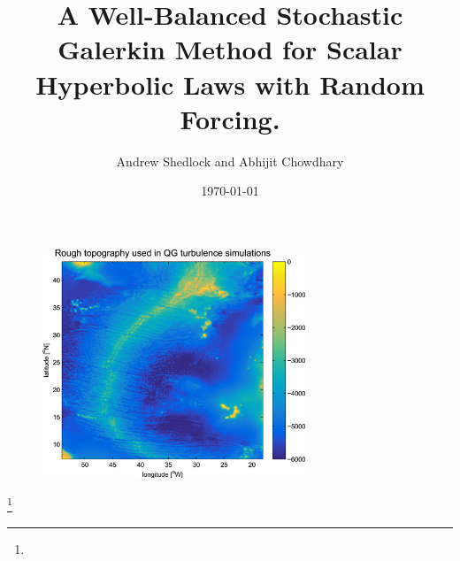 \documentclass[
    pdf,
    11pt,
    xcolor={svgnames},
  ]{beamer}
\title[WBSG for Random Scalar Hyperbolic Laws]{%
  A Well-Balanced Stochastic Galerkin Method for Scalar Hyperbolic Laws with Random Forcing.
}
\author[Chowdhary, Shedlock]{%
  Andrew Shedlock and Abhijit Chowdhary
}
\institute[NCSU]{
  Department of Mathematics \\
  North Carolina State University
}
\date[MA788 NCSU]{\today}
\newcommand\blfootnote[1]{%
  \begingroup
  \renewcommand\thefootnote{}\footnote{\scriptsize #1}%
  \addtocounter{footnote}{-1}%
  \endgroup
}
\begin{document}
\frame{ \titlepage }

\begin{frame}
\begin{figure}
\centering
\includegraphics[width=0.70\textwidth]{bottom_topography.jpg}
\end{figure}
\blfootnote{}
\end{frame}
\end{document}
